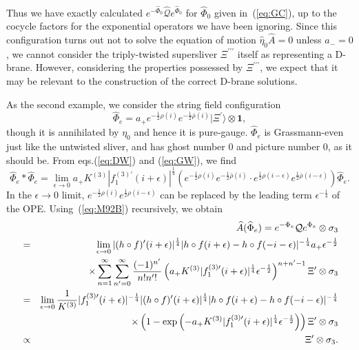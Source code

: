 \documentclass[a4paper,12pt]{article}
\newcommand{\cQ}{\mathcal{Q}}
\newcommand{\tp}{\prime\prime\prime}
\begin{document}
Thus we have exactly calculated $e^{-\widehat{\Phi}_0}\widehat{\cQ}e^{\widehat{\Phi}_0}$ 
for $\widehat{\Phi}_0$ given in~(\ref{eq:GC}), up to the cocycle factors 
for the exponential operators we have been ignoring. 
Since this configuration turns out not to solve 
the equation of motion $\widehat{\eta}_0\widehat{A}=0$ unless $a_-=0$, 
we cannot consider the triply-twisted supersliver $\Xi^{\tp}$ itself as 
representing a D-brane. However, considering the properties possessed by $\Xi^{\tp}$, 
we expect that it may be relevant 
to the construction of the correct D-brane solutions.
\smallskip

As the second example, we consider the string field configuration 
\begin{equation}
\widehat{\Phi}_e=a_+e^{-\frac{1}{2}\rho(i)}e^{-\frac{1}{2}\bar{\rho}(i)}|\Xi^{\prime}\rangle
\otimes\mathbf{1}, \label{eq:M92A}
\end{equation}
though it is annihilated by $\eta_0$ and hence it is pure-gauge. 
$\widehat{\Phi}_e$ is Grassmann-even just 
like the untwisted sliver, and has ghost number 0 and picture number 0, as it should be.  
From eqs.(\ref{eq:DW}) and (\ref{eq:GW}), we find 
\begin{equation}
\widehat{\Phi}_e *\widehat{\Phi}_e=\lim_{\epsilon\to 0}a_+K^{(3)}
|f^{(3)\prime}_1(i+\epsilon)|^{\frac{1}{4}}
\left(e^{-\frac{1}{2}\rho(i)}e^{-\frac{1}{2}\bar{\rho}(i)}\cdot 
e^{\frac{1}{2}\rho(i-\epsilon)}
e^{\frac{1}{2}\bar{\rho}(i-\epsilon)}\right)\widehat{\Phi}_e. \label{eq:M92B}
\end{equation}
In the $\epsilon\to 0$ limit, $e^{-\frac{1}{2}\rho(i)}e^{\frac{1}{2}\rho(i-\epsilon)}$ 
can be replaced by the leading term $\epsilon^{-\frac{1}{4}}$ of the OPE. 
Using~(\ref{eq:M92B}) recursively, we obtain 
\begin{eqnarray}
& &\hspace{-1.5cm}\widehat{A}(\widehat{\Phi}_e)=e^{-\Phi_e}\cQ e^{\Phi_e}\otimes \sigma_3 \nonumber \\
&=& \lim_{\epsilon\to 0}
|(h\circ f)^{\prime}(i+\epsilon)|^{\frac{1}{4}}|h\circ f(i+\epsilon)-h\circ f(-i-\epsilon)|^{-\frac{1}{4}}
a_+\epsilon^{-\frac{1}{2}}\nonumber \\ & &\times\sum_{n=1}^{\infty}
\sum_{n^{\prime}=0}^{\infty}\frac{(-1)^{n^{\prime}}}{n!n^{\prime}!}\left(a_+K^{(3)}
|f^{(3)\prime}_1(i+\epsilon)|^{\frac{1}{4}}\epsilon^{-\frac{1}{2}}\right)^{n+n^{\prime}-1}
\Xi^{\prime}\otimes\sigma_3 \nonumber \\
&=&\lim_{\epsilon\to 0}\frac{1}{K^{(3)}}|f^{(3)\prime}_1(i+\epsilon)|^{-\frac{1}{4}}
|(h\circ f)^{\prime}(i+\epsilon)|^{\frac{1}{4}}|h\circ f(i+\epsilon)-h\circ f(-i-\epsilon)|^{-\frac{1}{4}}\nonumber \\ & &\times
\left( 1-\exp\left(-a_+K^{(3)}|f^{(3)\prime}_1(i+\epsilon)|^{\frac{1}{4}}\epsilon^{-\frac{1}{2}}
\right)\right)\Xi^{\prime}\otimes\sigma_3  \label{eq:RF} \\
&\propto&\Xi^{\prime}\otimes\sigma_3. \nonumber
\end{eqnarray}
\end{document}
